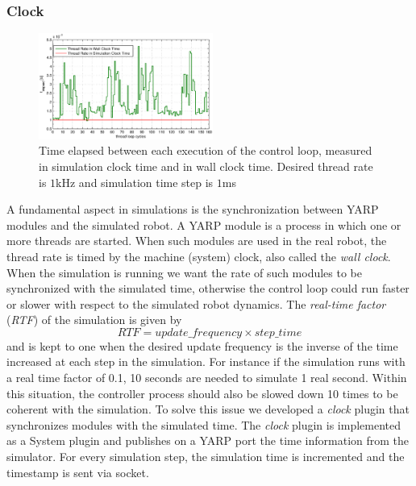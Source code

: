 \subsubsection{Clock}
\begin{figure}
  \centering
    \hspace*{-0.25in}
    \includegraphics[width=0.51\textwidth]{images/yarp_clock.eps}
    \caption{Time elapsed between each execution of the control loop, measured in simulation clock time and in wall clock time. Desired thread rate is $1$kHz and simulation time step is $1$ms}\label{yarp_clock_real_vs_simulated}
\end{figure}
A fundamental aspect in simulations is the synchronization between YARP modules and the simulated robot. A YARP module is a process in which one or more threads are started. When such modules are used in the real robot, the thread rate is timed by the machine (system) clock, also called the \emph{wall clock}. When the simulation is running we want the rate of such modules to be synchronized with the simulated time, otherwise the control loop could run faster or slower with respect to the simulated robot dynamics.
The \emph{real-time factor} (\emph{RTF}) of the simulation is given by 
\begin{equation}
    RTF = update\_frequency \times step\_time
\end{equation}
and is kept to one when the desired update frequency is the inverse of the time increased at each step in the simulation.
For instance if the simulation runs with a real time factor of 0.1, 10 seconds are needed to simulate 1 real second. Within this situation, the controller process should also be slowed down 10 times to be coherent with the simulation. To solve this issue we developed a \emph{clock} plugin that synchronizes modules with the simulated time.
The \emph{clock} plugin is implemented as a System plugin and publishes on a YARP port the time information from the simulator. For every simulation step, the simulation time is incremented and the timestamp is sent via socket.


